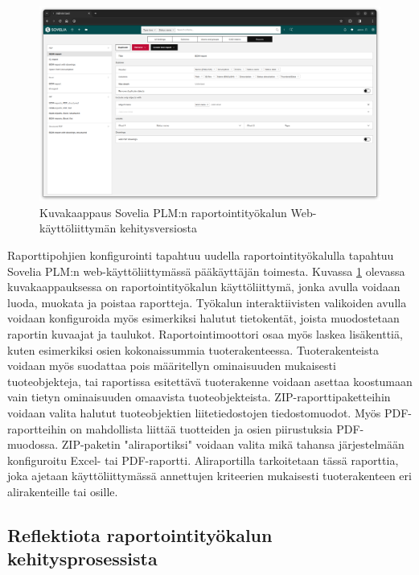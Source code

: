 \begin{figure}[h!]
\includegraphics[width=1\textwidth]{img/RAT.png}
\caption{Kuvakaappaus Sovelia PLM:n raportointityökalun Web-käyttöliittymän kehitysversiosta\label{fig:RAT}}
\end{figure}

Raporttipohjien konfigurointi tapahtuu uudella raportointityökalulla tapahtuu Sovelia PLM:n web-käyttöliittymässä pääkäyttäjän toimesta. Kuvassa \ref{fig:RAT} olevassa kuvakaappauksessa on raportointityökalun käyttöliittymä, jonka avulla voidaan luoda, muokata ja poistaa raportteja. Työkalun interaktiivisten valikoiden avulla voidaan konfiguroida myös esimerkiksi halutut tietokentät, joista muodostetaan raportin kuvaajat ja taulukot. Raportointimoottori osaa myös laskea lisäkenttiä, kuten esimerkiksi osien kokonaissummia tuoterakenteessa. Tuoterakenteista voidaan myös suodattaa pois määritellyn ominaisuuden mukaisesti tuoteobjekteja, tai raportissa esitettävä tuoterakenne voidaan asettaa koostumaan vain tietyn ominaisuuden omaavista tuoteobjekteista. ZIP-raporttipaketteihin voidaan valita halutut tuoteobjektien liitetiedostojen tiedostomuodot. Myös PDF-raportteihin on mahdollista liittää tuotteiden ja osien piirustuksia PDF-muodossa. ZIP-paketin "aliraportiksi" voidaan valita mikä tahansa järjestelmään konfiguroitu Excel- tai PDF-raportti. Aliraportilla tarkoitetaan tässä raporttia, joka ajetaan käyttöliittymässä annettujen kriteerien mukaisesti tuoterakenteen eri alirakenteille tai osille.


\subsection{Reflektiota raportointityökalun kehitysprosessista}


